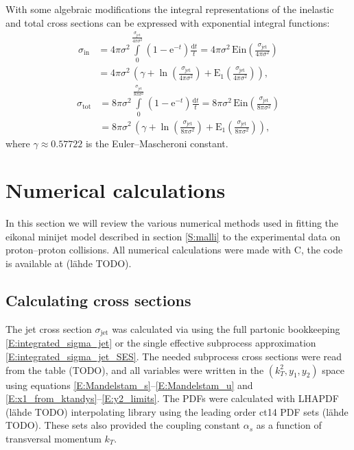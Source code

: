 \documentclass[a4paper, twoside, english, 12pt]{article}
\begin{document}
With some algebraic modifications the integral representations of the inelastic and total cross sections can be expressed with exponential integral functions:
\begin{align}
	\sigma_\text{in} &= 4\pi\sigma^2\int\limits_0^{\frac{\sigma_\text{jet}}{4\pi\sigma^2}} \left(1-\text{e}^{-t}\right)\frac{\text{d}t}{t} = 4\pi\sigma^2\,\text{Ein}(\frac{\sigma_\text{jet}}{4\pi\sigma^2}) \nonumber\\[0.6em] 
	&= 4\pi\sigma^2\,\left(\gamma+\ln(\frac{\sigma_\text{jet}}{4\pi\sigma^2})+\text{E}_1(\frac{\sigma_\text{jet}}{4\pi\sigma^2})\right), \label{E:sigma_in_ei} 
\end{align}
\begin{align}
	\sigma_\text{tot} &= 8\pi\sigma^2\int\limits_0^{\frac{\sigma_\text{jet}}{8\pi\sigma^2}} \left(1-\text{e}^{-t}\right)\frac{\text{d}t}{t} =  8\pi\sigma^2\,\text{Ein}(\frac{\sigma_\text{jet}}{8\pi\sigma^2})  \nonumber\\[0.6em] 
	&= 8\pi\sigma^2\,\left(\gamma+\ln(\frac{\sigma_\text{jet}}{8\pi\sigma^2})+\text{E}_1(\frac{\sigma_\text{jet}}{8\pi\sigma^2})\right), \label{E:sigma_tot_ei}
\end{align}
where $\gamma\approx 0.57722$ is the Euler--Mascheroni constant.


\section{Numerical calculations}


In this section we will review the various numerical methods used in fitting the eikonal minijet model described in section \ref{S:malli} to the experimental data on proton--proton collisions. All numerical calculations were made with C\nolinebreak[4]\hspace{-.05em}\raisebox{.4ex}{\tiny\bf ++}, the code is available at (lähde TODO).

\subsection{Calculating cross sections}\label{SS:numerical_sigma_jet}

The jet cross section $\sigma_{\text{jet}}$ was calculated via using the full partonic bookkeeping \eqref{E:integrated_sigma_jet} or the single effective subprocess approximation \eqref{E:integrated_sigma_jet_SES}. The needed subprocess cross sections were read from the table (TODO), and all variables were written in the $(k_T^2,y_1,y_2)$ space using equations \eqref{E:Mandelstam_s}--\eqref{E:Mandelstam_u} and \eqref{E:x1_from_ktandys}--\eqref{E:y2_limits}. The PDFs were calculated with LHAPDF (lähde TODO) interpolating library using the leading order ct14 PDF sets (lähde TODO). These sets also provided the coupling constant $\alpha_s$ as a function of transversal momentum $k_T$.
\end{document}
